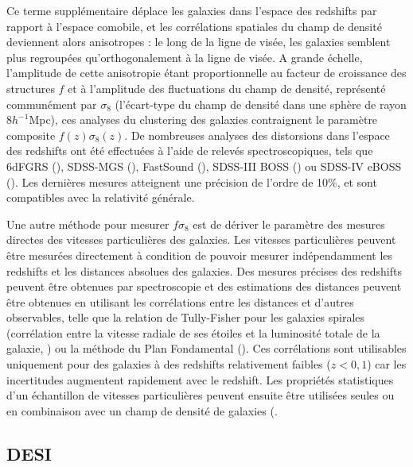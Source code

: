 \documentclass{book}
\begin{document}
Ce terme supplémentaire déplace les galaxies dans l'espace des redshifts par rapport à l'espace comobile, et les corrélations spatiales du champ de densité deviennent alors anisotropes : le long de la ligne de visée, les galaxies semblent plus regroupées qu'orthogonalement à la ligne de visée. A grande échelle, l'amplitude de cette anisotropie étant proportionnelle au facteur de croissance des structures $f$ et à l'amplitude des fluctuations du champ de densité, représenté communément par $\sigma_8$ (l'écart-type du champ de densité dans une sphère de rayon 8$h^{-1}$Mpc), ces analyses du clustering des galaxies contraignent le paramètre composite $f(z)\sigma_8(z)$. De nombreuses analyses des distorsions dans l'espace des redshifts ont été effectuées à l'aide de relevés spectroscopiques, tels que 6dFGRS (\cite{beutler_6df_2012}), SDSS-MGS (\cite{howlett_clustering_2015}), FastSound (\cite{okumura_subaru_2016}), SDSS-III BOSS (\cite{alam_clustering_2017}) ou SDSS-IV eBOSS (\cite{eboss_collaboration_completed_2021}). Les dernières mesures atteignent une précision de l'ordre de 10\%, et sont compatibles avec la relativité générale.

Une autre méthode pour mesurer $f\sigma_8$ est de dériver le paramètre des mesures directes des vitesses particulières des galaxies. Les vitesses particulières peuvent être mesurées directement à condition de pouvoir mesurer indépendamment les redshifts et les distances absolues des galaxies. Des mesures précises des redshifts peuvent être obtenues par spectroscopie et des estimations des distances peuvent être obtenues en utilisant les corrélations entre les distances et d'autres observables, telle que la relation de Tully-Fisher pour les galaxies spirales (corrélation entre la vitesse radiale de ses étoiles et la luminosité totale de la galaxie, \cite{tully_new_1977}) ou la méthode du Plan Fondamental (\cite{djorgovski_fundamental_1987}). Ces corrélations sont utilisables uniquement pour des galaxies à des redshifts relativement faibles ($z < 0,1$) car les incertitudes augmentent rapidement avec le redshift. Les propriétés statistiques d'un échantillon de vitesses particulières peuvent ensuite être utilisées seules ou en combinaison avec un champ de densité de galaxies (\cite{adams_joint_2020, qin_redshift_2019, turner_local_2023}.

\subsection{DESI}
\end{document}
